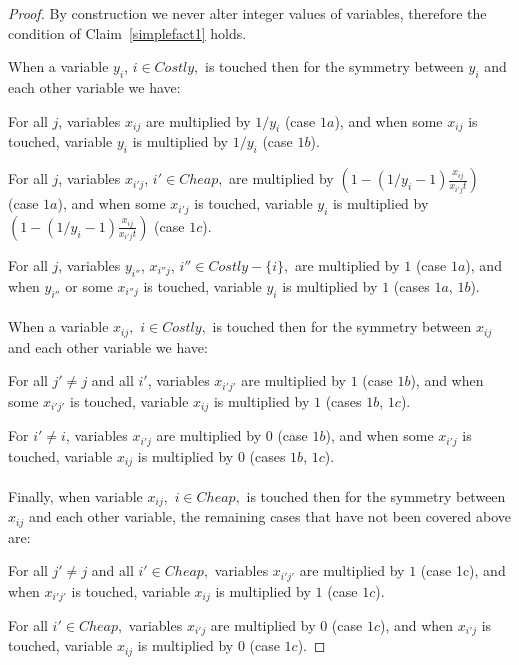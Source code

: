 \documentclass[11pt]{article}\usepackage{amsmath}
\begin{document}
\begin{proof}
By construction we never alter integer values of variables, therefore
the condition of Claim~\ref{simplefact1} holds. 

When a variable  $y_i$, $i \in Costly,$ is touched then  for the symmetry between
$y_i$ and each other variable we have:

 For all $j$, variables $x_{ij}$ are multiplied by $1/y_i$ (case $1a$), and when
 some $x_{ij}$ is touched, variable $y_i$ is multiplied by $1/y_i$ (case $1b$).

  For  all  $j$,   variables  $x_{i'j}$,  $i'  \in  Cheap,$   are  multiplied  by
  $(1- (1/y_i-1)\frac{x_{ij}}{x_{i'j}t})$ (case $1a$), and when some $x_{i'j}$ is
  touched, variable $y_i$ is multiplied by $(1- (1/y_i-1)\frac{x_{ij}}{x_{i'j}t})$
  (case $1c$).

 For all $j$, variables $y_{i''}$, $x_{i''j}$, $i'' \in Costly-\{i\},$ are
 multiplied  by  $1$ (case  $1a$),  and when  $y_{i''}$  or  some $x_{i''j}$  is
 touched, variable $y_i$ is multiplied by $1$ (cases $1a$, $1b$). \\\\


When  a variable  $x_{ij},$ $i  \in  Costly,$ is  touched then  for the  symmetry
between $x_{ij}$ and each other variable we have:

For all  $j'\neq j$  and all  $i'$, variables $x_{i'j'}$  are multiplied  by $1$
(case  $1b$),  and  when  some  $x_{i'j'}$  is  touched,  variable  $x_{ij}$  is
multiplied by $1$ (cases $1b$, $1c$).

  For $i'  \neq i$, variables $x_{i'j}$  are multiplied by $0$  (case $1b$), and
  when some $x_{i'j}$ is touched,  variable $x_{ij}$ is multiplied by $0$ (cases
  $1b$, $1c$). \\\\



Finally, when  variable  $x_{ij},$ $i  \in  Cheap,$ is  touched then  for the  symmetry
between $x_{ij}$ and each other variable, the remaining cases that have not been
covered above are: 

For all $j'\neq  j$ and all $i' \in Cheap,$  variables $x_{i'j'}$ are multiplied
by  $1$  (case  1c), and  when  $x_{i'j'}$  is  touched, variable  $x_{ij}$  is
multiplied by $1$ (case $1c$). 

For all  $i' \in  Cheap,$ variables $x_{i'j}$ are multiplied by $0$ (case
$1c$),  and when $x_{i'j}$  is touched,  variable $x_{ij}$  is multiplied  by $0$
(case $1c$). 

 

\end{proof}
\end{document}
